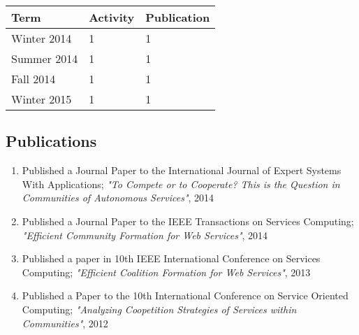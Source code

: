 \begin{center}
    \begin{tabular}{ | l | l | p{5cm} |}
    \hline
    Term & Activity & Publication \\ \hline
    Winter 2014 & 1 & 1 \\ \hline
    Summer 2014 & 1 & 1 \\ \hline
    Fall 2014 & 1 & 1 \\ \hline
    Winter 2015 & 1 & 1 \\
    \hline
    \end{tabular}
\end{center}


\subsection {Publications }

    \begin{enumerate}
        \item Published a Journal Paper to the International Journal of Expert Systems With Applications; \emph{"To Compete or to Cooperate? This is the Question in Communities of Autonomous Services"}, 2014
        \item Published a Journal Paper to the IEEE Transactions on Services Computing; \emph{"Efficient Community Formation for Web Services"}, 2014
        \item Published a paper in 10th IEEE International Conference on Services Computing; \emph{"Efficient Coalition Formation for Web Services"}, 2013
        \item Published a Paper to the 10th International Conference on Service Oriented Computing; \emph{"Analyzing Coopetition Strategies of Services within Communities"}, 2012
    \end{enumerate}

